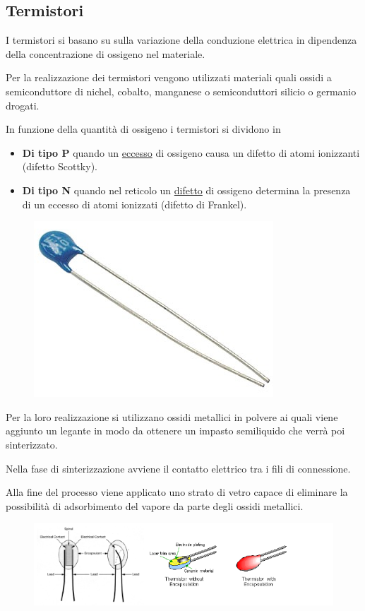 \documentclass[a4paper, 15pt]{article}
\begin{document}
\subsection{Termistori}
\begin{adjustwidth}{2in}{} 	
	I termistori si basano su sulla variazione della conduzione elettrica in dipendenza della concentrazione di ossigeno nel materiale. \newline 
	
	Per la realizzazione dei termistori vengono utilizzati materiali quali ossidi a semiconduttore di nichel, cobalto, manganese o semiconduttori silicio o germanio drogati. \newline 
	
	In funzione della quantità di ossigeno i termistori si dividono in 
	\begin{itemize}
		\item \textbf{Di tipo P} quando un \underline{eccesso} di ossigeno causa un difetto di atomi ionizzanti (difetto Scottky).
		\item \textbf{Di tipo N} quando nel reticolo un \underline{difetto} di ossigeno determina la presenza di un eccesso di atomi ionizzati (difetto di Frankel).
	\end{itemize}
	\begin{figure}[H]
		\centering
		\includegraphics[width=0.2\linewidth]{immagini/screenshot013}
		\label{fig:screenshot013}
	\end{figure}
	Per la loro realizzazione si utilizzano ossidi metallici in polvere ai quali viene aggiunto un legante in modo da ottenere un impasto semiliquido che verrà poi sinterizzato. 
	
	Nella fase di sinterizzazione avviene il contatto elettrico tra i fili di connessione. 
	
	Alla fine del processo viene applicato uno strato di vetro capace di eliminare la possibilità di adsorbimento del vapore da parte degli ossidi metallici. 
	\begin{figure}[H]
		\centering
		\includegraphics[width=0.5\linewidth]{immagini/screenshot014}
		\label{fig:screenshot014}
	\end{figure}

\end{adjustwidth}
\end{document}
